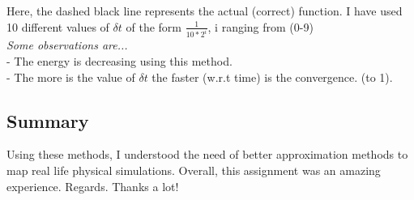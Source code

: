 \documentclass{article}
\begin{document}
        Here, the dashed black line represents the actual (correct) function. I have used 10 different values of \(\delta t\) of the form \(\frac{1}{10 * 2^i}\), i ranging from (0-9) \\[20pt]
        \textit{Some observations are...} \\
             - The energy is decreasing using this method. \\
             - The more is the value of \(\delta t\) the faster (w.r.t time) is the convergence. (to 1).


    \subsection*{Summary}
    Using these methods, I understood the need of better approximation methods to map real life physical simulations. Overall, this assignment was an amazing experience. Regards. Thanks a lot!
\end{document}
